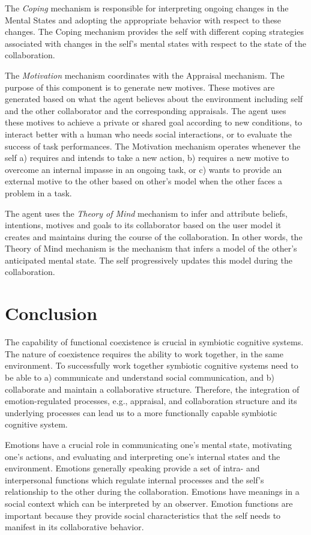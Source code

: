 \documentclass[letterpaper]{article}
\begin{document}
The \textit{Coping} mechanism is responsible for interpreting ongoing changes
in the Mental States and adopting the appropriate behavior with respect to these
changes. The Coping mechanism provides the self with different coping strategies
associated with changes in the self's mental states with respect to the state of
the collaboration.

The \textit{Motivation} mechanism coordinates with the Appraisal mechanism. The
purpose of this component is to generate new motives. These motives are
generated based on what the agent believes about the environment including self
and the other collaborator and the corresponding appraisals. The agent uses
these motives to achieve a private or shared goal according to new conditions,
to interact better with a human who needs social interactions, or to evaluate
the success of task performances. The Motivation mechanism operates whenever the
self a) requires and intends to take a new action, b) requires a new motive to
overcome an internal impasse in an ongoing task, or c) wants to provide an
external motive to the other based on other's model when the other faces a
problem in a task.

The agent uses the \textit{Theory of Mind} mechanism to infer and attribute
beliefs, intentions, motives and goals to its collaborator based on the user
model it creates and maintains during the course of the collaboration. In
other words, the Theory of Mind mechanism is the mechanism that infers a model
of the other's anticipated mental state. The self progressively updates this
model during the collaboration.

\section{Conclusion}

The capability of functional coexistence is crucial in symbiotic cognitive
systems. The nature of coexistence requires the ability to work together, in the
same environment. To successfully work together symbiotic cognitive systems need
to be able to a) communicate and understand social communication, and b)
collaborate and maintain a collaborative structure. Therefore, the integration
of emotion-regulated processes, e.g., appraisal, and collaboration structure and
its underlying processes can lead us to a more functionally capable symbiotic
cognitive system.

Emotions have a crucial role in communicating one's mental state, motivating
one's actions, and evaluating and interpreting one's internal states and the
environment. Emotions generally speaking provide a set of intra- and
interpersonal functions which regulate internal processes and the self's
relationship to the other during the collaboration.
Emotions have meanings in a social context which can be interpreted by an
observer. Emotion functions are important because they provide social
characteristics that the self needs to manifest in its collaborative behavior. 
\end{document}
